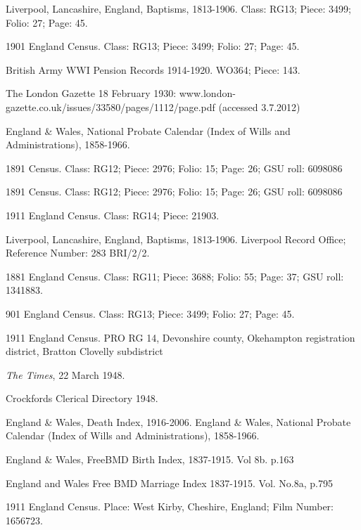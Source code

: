 \begin{thebibliography}{99}
{
	Liverpool, Lancashire, England, Baptisms, 1813-1906.
	Class: RG13; Piece: 3499; Folio: 27; Page: 45.
	
	1901 England Census.
	Class: RG13; Piece: 3499; Folio: 27; Page: 45.
	
	British Army WWI Pension Records 1914-1920.  WO364; Piece: 143.
	
	 The London Gazette 18 February 1930: www.london-gazette.co.uk/issues/33580/pages/1112/page.pdf (accessed 3.7.2012)


	England & Wales, National Probate Calendar (Index of Wills and Administrations), 1858-1966. 
	
	1891 Census.
	Class: RG12; Piece: 2976; Folio: 15; Page: 26; GSU roll: 6098086
	
	1891 Census. Class: RG12; Piece: 2976; Folio: 15; Page: 26; GSU roll: 6098086
	
	1911 England Census. Class: RG14; Piece: 21903.
	
	Liverpool, Lancashire, England, Baptisms, 1813-1906.
	Liverpool Record Office; Reference Number: 283 BRI/2/2.
	
	1881 England Census. Class: RG11; Piece: 3688; Folio: 55; Page: 37; GSU roll: 1341883.
	
	901 England Census. Class: RG13; Piece: 3499; Folio: 27; Page: 45.
	
	1911 England Census. PRO RG 14, Devonshire county, Okehampton registration district, 
	Bratton Clovelly subdistrict
	
	\emph{The Times}, 22 March 1948.

	 Crockfords Clerical Directory 1948. 
	 
	 England & Wales, Death Index, 1916-2006.
	 England & Wales, National Probate Calendar (Index of Wills and Administrations), 1858-1966. 
	 
	England & Wales, FreeBMD Birth Index, 1837-1915. Vol 8b. p.163
	
	England and Wales Free BMD Marriage Index 1837-1915. Vol. No.8a, p.795
	
	1911 England Census. Place: West Kirby, Cheshire, England; Film Number: 1656723.

}
\end{thebibliography}
